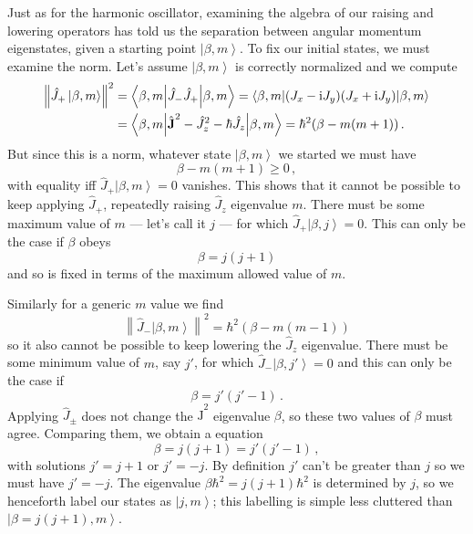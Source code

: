 \documentclass{article}
\theoremstyle{plain}\theoremheaderfont{\normalfont\itshape}\theorembodyfont{\rmfamily}\theoremseparator{.}\newtheorem*{rem}{Remark}\newtheorem*{ex}{Example}\newtheorem*{proof}{Proof}\newtheorem*{altp}{Alternative proof}
\theoremstyle{plain}\theoremheaderfont{\normalfont\bfseries}\theorembodyfont{\rmfamily}\theoremseparator{.}\newtheorem{thm}{Theorem}[section]\newtheorem{lem}[thm]{Lemma}\newtheorem{prop}[thm]{Proposition}\newtheorem*{cor}{Corollary}\newtheorem{defn}[thm]{Definition}\newtheorem{clm}[thm]{Claim}\newtheorem{clminproof}{Claim}
\theoremstyle{break}\theoremheaderfont{\normalfont\itshape}\theorembodyfont{\rmfamily}\theoremseparator{.\medskip}\newtheorem*{proofskip}{Proof}\newtheorem*{exs}{Examples}\newtheorem*{rems}{Remarks}
\theoremstyle{break}\theoremheaderfont{\normalfont\bfseries}\theorembodyfont{\rmfamily}\theoremseparator{.\medskip}\newtheorem{lemskip}[thm]{Lemma}\newtheorem{defnskip}[thm]{Definition}\newtheorem{propskip}[thm]{Proposition}\newtheorem{thmskip}[thm]{Theorem}
\numberwithin{equation}{section}
\newcommand{\ii}{\mathrm{i}}
\newcommand{\ket}[1]{\left| #1 \right\rangle}
\newcommand{\expval}[2]{\left\langle #2 \middle| #1 \middle| #2 \right\rangle}
\newcommand{\vb}[1]{\bm{\mathrm{#1}}}
\newcommand{\norm}[1]{\left\| #1 \right\|}
\begin{document}
    Just as for the harmonic oscillator, examining the algebra of our raising and lowering operators has told us the separation between angular momentum eigenstates, given a starting point \(\ket{\beta,m}\). To fix our initial states, we must examine the norm. Let's assume \(\ket{\beta,m}\) is correctly normalized and we compute
    \begin{align}
        \norm{\hat{J}_+\ket{\beta,m}}^2&=\expval{\hat{J}_-\hat{J}_+}{\beta,m}=\expval{(J_x-\ii J_y)(J_x+\ii J_y)}{\beta,m}\notag\\
        &=\expval{\hat{\vb{J}}^2-\hat{J}_z^2-\hbar \hat{J}_z}{\beta,m}=\hbar^2(\beta-m(m+1))\,.
    \end{align}
    But since this is a norm, whatever state \(\ket{\beta,m}\) we started we must have
    \begin{equation}
        \beta-m(m+1)\ge 0\,,
    \end{equation}
    with equality iff \(\hat{J}_+\ket{\beta,m}=0\) vanishes. This shows that it cannot be possible to keep applying \(\hat{J}_+\), repeatedly raising \(\hat{J}_z\) eigenvalue \(m\). There must be some maximum value of \(m\) --- let's call it \(j\) --- for which \(\hat{J}_+\ket{\beta,j}=0\). This can only be the case if \(\beta\) obeys
    \begin{equation}
        \beta=j(j+1)
    \end{equation}
    and so is fixed in terms of the maximum allowed value of \(m\).

    Similarly for a generic \(m\) value we find
    \begin{equation}
        \norm{\hat{J}_-\ket{\beta,m}}^2=\hbar^2(\beta-m(m-1))
    \end{equation}
    so it also cannot be possible to keep lowering the \(\hat{J}_z\) eigenvalue. There must be some minimum value of \(m\), say \(j'\), for which \(\hat{J}_-\ket{\beta,j'}=0\) and this can only be the case if
    \begin{equation}
        \beta=j'(j'-1)\,.
    \end{equation}
    Applying \(\hat{J}_\pm\) does not change the \(\hat{\vb{J}}^2\) eigenvalue \(\beta\), so these two values of \(\beta\) must agree. Comparing them, we obtain a equation
    \begin{equation}
        \beta=j(j+1)=j'(j'-1)\,,
    \end{equation}
    with solutions \(j'=j+1\) or \(j'=-j\). By definition \(j'\) can't be greater than \(j\) so we must have \(j'=-j\). The eigenvalue \(\beta\hbar^2=j(j+1)\hbar^2\) is determined by \(j\), so we henceforth label our states as \(\ket{j,m}\); this labelling is simple less cluttered than \(\ket{\beta=j(j+1),m}\).
    
\end{document}
